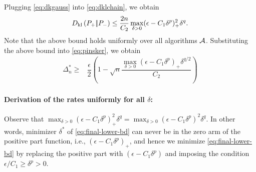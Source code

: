 Plugging \eqref{eq:dkgauss} into \eqref{eq:dklchain}, we obtain
\begin{align}
D_{\rm kl}\left({P_{+}} |\!| {P_{-}} \right) \le \dfrac{2n}{C_2} \max_{\delta>0} (\epsilon-C_1\delta^p)_+^2 \delta^q.
\end{align}
Note that the above bound holds uniformly over all algorithms $\mathcal{A}$. 
Substituting the above bound into \eqref{eq:pinsker}, we obtain 
\begin{align}
 \Delta_n^{*}
  \ge & \dfrac{\epsilon}{2} \left(1 - \sqrt{
    n}  \dfrac{\max_{\delta>0} (\epsilon-C_1\delta^p)_+\delta^{q/2}}{C_2}
  \right)\label{eq:final-lower-bd}
\end{align}

% 
% 
% 

\paragraph{Derivation of the rates uniformly for all $\delta$:}
Observe that $\max_{\delta> 0} (\epsilon - C_1 \delta^p)^2_+ \delta^q = \max_{\delta> 0} (\epsilon - C_1 \delta^p)^2 \delta^q$. 
In other words, minimizer $\delta^*$ of \eqref{eq:final-lower-bd} can never be in the zero arm of the positive part function, i.e., $(\epsilon - C_1 \delta^p)_+ $, and hence we minimize \eqref{eq:final-lower-bd} by replacing the positive part with $(\epsilon - C_1 \delta^p)$ and imposing the condition $\epsilon/C_1 \ge \delta^p>0$.

